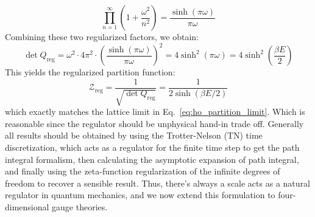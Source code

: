 \begin{equation}
\prod_{n=1}^\infty \left( 1 + \frac{\omega^2}{n^2} \right) = \frac{\sinh(\pi\omega)}{\pi\omega}
\label{eq:euler_prod_sinh}
\end{equation}
Combining these two regularized factors, we obtain:
\begin{equation}
\det Q_{\mathrm{reg}} = \omega^2 \cdot 4\pi^2 \cdot \left( \frac{\sinh(\pi\omega)}{\pi\omega} \right)^2 = 4\sinh^2(\pi\omega) = 4\sinh^2\left(\frac{\beta E}{2}\right)
\label{eq:det_Q_reg_final}
\end{equation}
This yields the regularized partition function:
\begin{equation}
\mathcal{Z}_{\mathrm{reg}} = \frac{1}{\sqrt{\det Q_{\mathrm{reg}}}} = \frac{1}{2\sinh(\beta E / 2)}
\end{equation}
which exactly matches the lattice limit in Eq.~\eqref{eq:ho_partition_limit}. Which is reasonable since the regulator should be unphysical hand-in trade off. Generally all results should be obtained by using the Trotter-Nelson (TN) time discretization, which acts as a regulator for the finite time step to get the path integral formalism, then calculating the asymptotic expansion of path integral, and finally using the zeta-function regularization of the infinite degrees of freedom to recover a sensible result. Thus, there's always a scale acts as a natural regulator in quantum mechanics, and we now extend this formulation to four-dimensional gauge theories.

